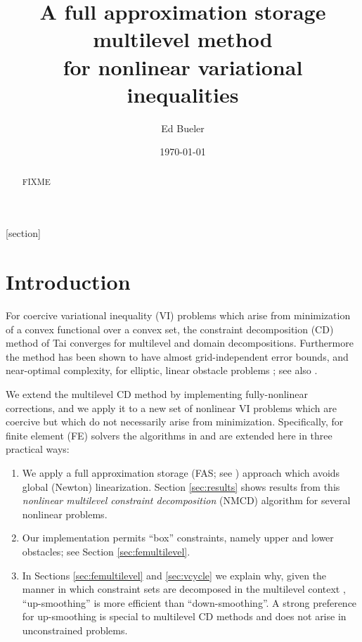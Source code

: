 \documentclass[letterpaper,final,12pt,reqno]{amsart}
\theoremstyle{cstyle}
\theoremstyle{cstyle*}
\theoremstyle{dstyle}
\numberwithin{equation}{section}
\numberwithin{figure}{section}
\numberwithin{table}{section}
\numberwithin{theorem}{section}
\begin{document}
\title[FAS for nonlinear variational inequalities]{A full approximation storage multilevel method \\ for nonlinear variational inequalities}

\author{Ed Bueler}

\date{\today}

\begin{abstract} FIXME
\end{abstract}

\maketitle

\tableofcontents

\thispagestyle{empty}

[section]


\section{Introduction} \label{sec:intro}

For coercive variational inequality (VI) problems which arise from minimization of a convex functional over a convex set, the constraint decomposition (CD) method of Tai \cite{Tai2003} converges for multilevel and domain decompositions.  Furthermore the method has been shown to have almost grid-independent error bounds, and near-optimal complexity, for elliptic, linear obstacle problems \cite[Subsection 5.4]{Tai2003}; see also \cite[Theorem 4.6 and Algorithm 4.7]{GraeserKornhuber2009}.

We extend the multilevel CD method by implementing fully-nonlinear corrections, and we apply it to a new set of nonlinear VI problems which are coercive but which do not necessarily arise from minimization.  Specifically, for finite element (FE) solvers the algorithms in \cite{GraeserKornhuber2009} and \cite{Tai2003} are extended here in three practical ways:
\renewcommand{\labelenumi}{\emph{(\roman{enumi})}}
\begin{enumerate}
\item We apply a full approximation storage (FAS; see \cite{Brandt1977,Bruneetal2015}) approach which avoids global (Newton) linearization.  Section \ref{sec:results} shows results from this \emph{nonlinear multilevel constraint decomposition} (NMCD) algorithm  for several nonlinear problems.
\item Our implementation permits ``box'' constraints, namely upper and lower obstacles; see Section \ref{sec:femultilevel}.
\item In Sections \ref{sec:femultilevel} and \ref{sec:vcycle} we explain why, given the manner in which constraint sets are decomposed in the multilevel context \cite{GraeserKornhuber2009}, ``up-smoothing'' is more efficient than ``down-smoothing''.  A strong preference for up-smoothing is special to multilevel CD methods and does not arise in unconstrained problems.
\end{enumerate}
\end{document}
